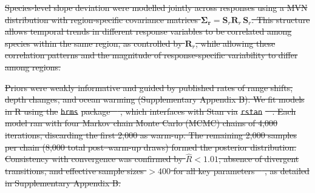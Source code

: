 \documentclass[9pt,twocolumn,twoside]{pnas-new}
\providecommand{\DIFdel}[1]{{\protect\color{red}\sout{#1}}} %
\providecommand{\DIFaddbegin}{} %
\providecommand{\DIFaddend}{} %
\providecommand{\DIFdelbegin}{} %
\providecommand{\DIFdelend}{} %
\begin{document}
{%
\DIFdel{Species-level slope deviation were modelled jointly across responses using a MVN distribution with region-specific covariance matrices $\boldsymbol{\Sigma_r} = \mathbf{S}_{r}\mathbf{R}_{r}\,\mathbf{S}_{r}$. This structure allows temporal trends in different response variables to be correlated among species within the same region, as controlled by $\mathbf{R}_{r}$, while allowing these correlation patterns and the magnitude of response-specific variability to differ among regions.
}%

\DIFdel{Priors were weakly informative and guided by published rates of range shifts, depth changes, and ocean warming (Supplementary Appendix B). We fit models in R using the }\texttt{\DIFdel{brms}} %
\DIFdel{package \mbox{%
\citep{burkner_brms_2017}}\hskip0pt%
, which interfaces with Stan via }\texttt{\DIFdel{rstan}} %
\DIFdel{\mbox{%
\citep{stan2024,stan_development_team_rstan_2024}}\hskip0pt%
. Each model ran with four Markov chain Monte Carlo (MCMC) chains of 4,000 iterations, discarding the first 2,000 as warm-up. The remaining 2,000 samples per chain (8,000 total post–warm-up draws) formed the posterior distribution. Consistency with convergence was confirmed by $\hat{R} < 1.01$, absence of divergent transitions, and effective sample sizes $> 400$ for all key parameters \mbox{%
\citep{vehtari_rank-normalization_2021}}\hskip0pt%
, as detailed in Supplementary Appendix B.
}}

\DIFdelend \showmatmethods{} %


\DIFdelbegin %
\DIFdelend \DIFaddbegin {}
\DIFaddend 
\end{document}
